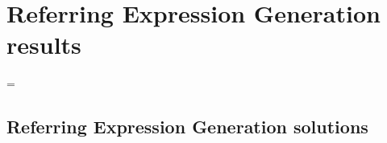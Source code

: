 \chapter{Referring Expression Generation results}
\label{app:reg}

\LTcapwidth=\textwidth


\let\oldlongtable\longtable
\let\endoldlongtable\endlongtable

\def\zza{\global\let\zz\zzb
\fullwidthcolor{lightgray}}%

\def\zzb{\global\let\zz\zza}

\def\fullwidthcolor#1{\color{#1}\leaders\vrule\hskip\textwidth\hskip-\textwidth\kern0pt}
\def\resetLTcolor{\global\let\zz\zza}


\section{Referring Expression Generation solutions}

